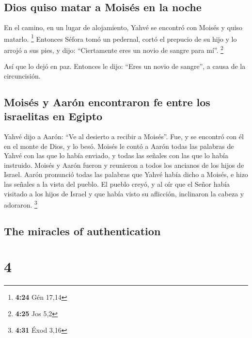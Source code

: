 \begin{paracol}{2}
\hypertarget{dios-quiso-matar-a-moisuxe9s-en-la-noche}{%
\subsection{Dios quiso matar a Moisés en la
noche}\label{dios-quiso-matar-a-moisuxe9s-en-la-noche}}

 En el camino, en un lugar de alojamiento, Yahvé se
encontró con Moisés y quiso matarlo. \footnote{\textbf{4:24} Gén 17,14}
 Entonces Séfora tomó un pedernal, cortó el prepucio de
su hijo y lo arrojó a sus pies, y dijo: ``Ciertamente eres un novio de
sangre para mí''. \footnote{\textbf{4:25} Jos 5,2}

 Así que lo dejó en paz. Entonces le dijo: ``Eres un
novio de sangre'', a causa de la circuncisión.

\hypertarget{moisuxe9s-y-aaruxf3n-encontraron-fe-entre-los-israelitas-en-egipto}{%
\subsection{Moisés y Aarón encontraron fe entre los israelitas en
Egipto}\label{moisuxe9s-y-aaruxf3n-encontraron-fe-entre-los-israelitas-en-egipto}}

 Yahvé dijo a Aarón: ``Ve al desierto a recibir a
Moisés''. Fue, y se encontró con él en el monte de Dios, y lo besó.
 Moisés le contó a Aarón todas las palabras de Yahvé con
las que lo había enviado, y todas las señales con las que lo había
instruido.  Moisés y Aarón fueron y reunieron a todos los
ancianos de los hijos de Israel.  Aarón pronunció todas
las palabras que Yahvé había dicho a Moisés, e hizo las señales a la
vista del pueblo.  El pueblo creyó, y al oír que el Señor
había visitado a los hijos de Israel y que había visto su aflicción,
inclinaron la cabeza y adoraron. \footnote{\textbf{4:31} Éxod 3,16}

\switchcolumn
\begin{otherlanguage}{english}

\hypertarget{the-miracles-of-authentication}{%
\subsection{The miracles of
authentication}\label{the-miracles-of-authentication}}

\hypertarget{section-7}{%
\section{4}\label{section-7}}


\end{otherlanguage}
\end{paracol}
